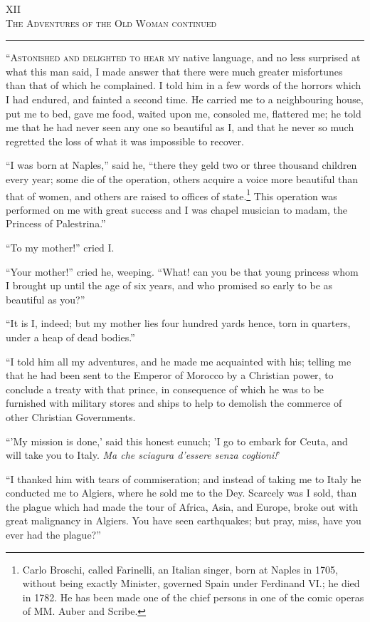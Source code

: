 \begin{center}
XII\\
\textsc{The Adventures of the Old Woman continued}
\end{center}
\vspace{-0.5cm}
\rule{\textwidth}{0.5pt}
\lettrine{``A}{stonished and delighted to hear my} native language, and no less surprised at what this man said, I made answer that there were much greater misfortunes than that of which he complained. I told him in a few words of the horrors which I had endured, and fainted a second time. He carried me to a neighbouring house, put me to bed, gave me food, waited upon me, consoled me, flattered me; he told me that he had never seen any one so beautiful as I, and that he never so much regretted the loss of what it was impossible to recover.

``I was born at Naples,'' said he, ``there they geld two or three thousand children every year; some die of the operation, others acquire a voice more beautiful than that of women, and others are raised to offices of state.\footnote{Carlo Broschi, called Farinelli, an Italian singer, born at Naples in 1705, without being exactly Minister, governed Spain under Ferdinand VI.; he died in 1782. He has been made one of the chief persons in one of the comic operas of MM. Auber and Scribe.} This operation was performed on me with great success and I was chapel musician to madam, the Princess of Palestrina.''

``To my mother!'' cried I.

``Your mother!'' cried he, weeping. ``What! can you be that young princess whom I brought up until the age of six years, and who promised so early to be as beautiful as you?''

``It is I, indeed; but my mother lies four hundred yards hence, torn in quarters, under a heap of dead bodies.''

``I told him all my adventures, and he made me acquainted with his; telling me that he had been sent to the Emperor of Morocco by a Christian power, to conclude a treaty with that prince, in consequence of which he was to be furnished with military stores and ships to help to demolish the commerce of other Christian Governments.

``'My mission is done,' said this honest eunuch; 'I go to embark for Ceuta, and will take you to Italy. \textit{Ma che sciagura d'essere senza coglioni!}'

``I thanked him with tears of commiseration; and instead of taking me to Italy he conducted me to Algiers, where he sold me to the Dey. Scarcely was I sold, than the plague which had made the tour of Africa, Asia, and Europe, broke out with great malignancy in Algiers. You have seen earthquakes; but pray, miss, have you ever had the plague?''

